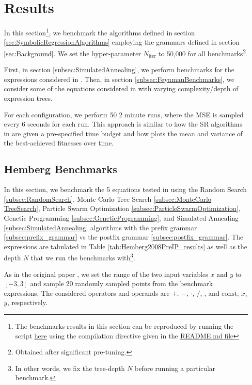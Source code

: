 \documentclass[runningheads]{llncs}
\newcommand\specialcaret{%
  \stackengine{0pt}{\ \,}{\scalebox{1.1}[2]{\raisebox{-0.9ex}{\string^}}}{O}{c}{F}{T}{L}}
\begin{document}
\section{Results}\label{sec:Results}
In this section\footnote{The benchmarks results in this section can be reproduced by running the script \href{https://github.com/edfink234/Alpha-Zero-Symbolic-Regression/blob/0b5b6d0b56c2d108dda023a337edeb1084436da7/PrefixPostfixSR.cpp}{here} using the compilation directive given in the \href{https://github.com/edfink234/Alpha-Zero-Symbolic-Regression/blob/0b5b6d0b56c2d108dda023a337edeb1084436da7/README.md}{README.md file}}, we benchmark the algorithms defined in section \ref{sec:SymbolicRegressionAlgorithms} employing the grammars defined in section \ref{sec:Background}. We set the hyper-parameter $N_{\mathrm{iter}}$ to 50,000 for all benchmarks\footnote{Obtained after significant pre-tuning.}.
\par First, in section \ref{subsec:SimulatedAnnealing}, we perform benchmarks for the expressions considered in \cite{hemberg2008pre}. Then, in section \ref{subsec:FeynmanBenchmarks}, we consider some of the equations considered in \cite{udrescu2020ai} with varying complexity/depth of expression trees.
\par For each configuration,
we perform 50 2 minute runs, where the MSE is sampled every 6 seconds for each run.  
This approach is similar to how the SR algorithms in \cite{defranca2023interpretable} are given a pre-specified time budget and how \cite{manti2023discovering} plots the mean and variance of the best-achieved fitnesses over time. 

\subsection{Hemberg Benchmarks} \label{subsec:HembergBenchmarks}
In this section, we benchmark the 5 equations tested in \cite{hemberg2008pre} using the Random Search \ref{subsec:RandomSearch}, Monte Carlo Tree Search \ref{subsec:MonteCarlo TreeSearch}, Particle Swarm Optimization \ref{subsec:ParticleSwarmOptimization}, Genetic Programming \ref{subsec:GeneticProgramming}, and Simulated Annealing \ref{subsec:SimulatedAnnealing} algorithms with the prefix grammar \ref{subsec:prefix_grammar} vs the postfix grammar \ref{subsec:postfix_grammar}. The expressions are tabulated in Table \ref{tab:Hemberg2008PreIP_results} as well as the depth $N$ that we run the benchmarks with\footnote{In other words, we fix the tree-depth $N$ before running a particular benchmark.}.
\par As in the original paper \cite{hemberg2008pre}, we set the range of the two input variables $x$ and $y$ to $[-3,3]$ and sample 20 randomly sampled points from the benchmark expressions.  The considered operators and operands are $+$, $-$, $\cdot$, $/$, \specialcaret , and $\mathrm{const}$, $x$, $y$, respectively.
\end{document}
